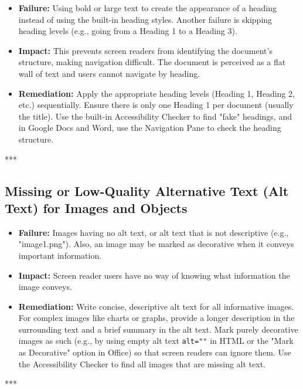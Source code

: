 \begin{itemize}
	\item \textbf{Failure:} Using bold or large text to create the appearance of a heading instead of using the built-in heading styles. Another failure is skipping heading levels (e.g., going from a Heading 1 to a Heading 3).
	\item \textbf{Impact:} This prevents screen readers from identifying the document's structure, making navigation difficult. The document is perceived as a flat wall of text and users cannot navigate by heading.
	\item \textbf{Remediation:} Apply the appropriate heading levels (Heading 1, Heading 2, etc.) sequentially. Ensure there is only one Heading 1 per document (usually the title). Use the built-in Accessibility Checker to find "fake" headings, and in Google Docs and Word, use the Navigation Pane to check the heading structure.
\end{itemize}

***

\subsection{Missing or Low-Quality Alternative Text (Alt Text) for Images and Objects}
\label{sub:missing-or-low-quality-alternative-text-alt-text-for-images-and-objects}

\begin{itemize}
	\item \textbf{Failure:} Images having no alt text, or alt text that is not descriptive (e.g., "image1.png"). Also, an image may be marked as decorative when it conveys important information.
	\item \textbf{Impact:} Screen reader users have no way of knowing what information the image conveys.
	\item \textbf{Remediation:} Write concise, descriptive alt text for all informative images. For complex images like charts or graphs, provide a longer description in the surrounding text and a brief summary in the alt text. Mark purely decorative images as such (e.g., by using empty alt text \texttt{alt=""} in HTML or the "Mark as Decorative" option in Office) so that screen readers can ignore them. Use the Accessibility Checker to find all images that are missing alt text.
\end{itemize}

***

